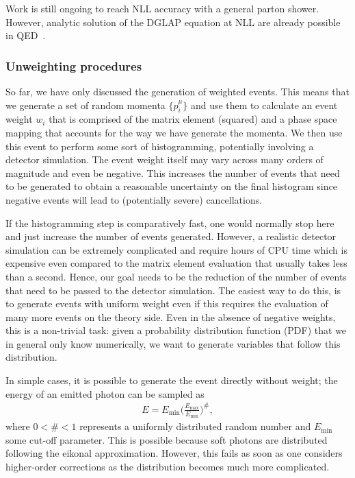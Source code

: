 Work is still ongoing to reach NLL accuracy with a general parton shower.
However, analytic solution of the DGLAP equation at NLL are already possible in QED~\cite{Bertone:2019hks}.

\subsubsection{Unweighting procedures}
\label{sec:mc:unweight}
So far, we have only discussed the generation of weighted events.
This means that we generate a set of random momenta $\{p_i^\mu\}$ and use them to calculate an event weight $w_i$ that is comprised of the matrix element (squared) and a phase space mapping that accounts for the way we have generate the momenta.
We then use this event to perform some sort of histogramming, potentially involving a detector simulation.
The event weight itself may vary across many orders of magnitude and even be negative.
This increases the number of events that need to be generated to obtain a reasonable uncertainty on the final histogram since negative events will lead to (potentially severe) cancellations.

If the histogramming step is comparatively fast, one would normally stop here and just increase the number of events generated.
However, a realistic detector simulation can be extremely complicated and require hours of CPU time which is expensive even compared to the matrix element evaluation that usually takes less than a second.
Hence, our goal needs to be the reduction of the number of events that need to be passed to the detector simulation.
The easiest way to do this, is to generate events with uniform weight even if this requires the evaluation of many more events on the theory side.
Even in the absence of negative weights, this is a non-trivial task:
given a probability distribution function (PDF) that we in general only know numerically, we want to generate variables that follow this distribution.

In simple cases, it is possible to generate the event directly without weight; the energy of an emitted photon can be sampled as
\begin{align}
    E = E_\text{min} \Big(\frac{E_\text{max}}{E_{\text{min}}}\Big)^\#,
\end{align}
where $0<\#<1$ represents a uniformly distributed random number and $E_\text{min}$ some cut-off parameter.
This is possible because soft photons are distributed following the eikonal approximation.
However, this fails as soon as one considers higher-order corrections as the distribution becomes much more complicated.


